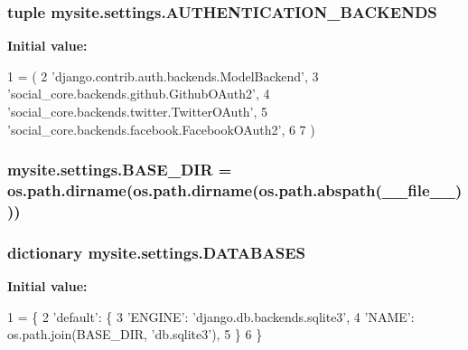 \subsubsection[{\texorpdfstring{A\+U\+T\+H\+E\+N\+T\+I\+C\+A\+T\+I\+O\+N\+\_\+\+B\+A\+C\+K\+E\+N\+DS}{AUTHENTICATION_BACKENDS}}]{\setlength{\rightskip}{0pt plus 5cm}tuple mysite.\+settings.\+A\+U\+T\+H\+E\+N\+T\+I\+C\+A\+T\+I\+O\+N\+\_\+\+B\+A\+C\+K\+E\+N\+DS}\hypertarget{namespacemysite_1_1settings_a6224dd38a093d2571bb1f7cb15f252b8}{}\label{namespacemysite_1_1settings_a6224dd38a093d2571bb1f7cb15f252b8}
{\bfseries Initial value\+:}
\begin{DoxyCode}
1 = (
2     \textcolor{stringliteral}{'django.contrib.auth.backends.ModelBackend'},
3     \textcolor{stringliteral}{'social\_core.backends.github.GithubOAuth2'},
4     \textcolor{stringliteral}{'social\_core.backends.twitter.TwitterOAuth'},
5     \textcolor{stringliteral}{'social\_core.backends.facebook.FacebookOAuth2'},
6 
7 )
\end{DoxyCode}
\subsubsection[{\texorpdfstring{B\+A\+S\+E\+\_\+\+D\+IR}{BASE_DIR}}]{\setlength{\rightskip}{0pt plus 5cm}mysite.\+settings.\+B\+A\+S\+E\+\_\+\+D\+IR = os.\+path.\+dirname(os.\+path.\+dirname(os.\+path.\+abspath(\+\_\+\+\_\+file\+\_\+\+\_\+)))}\hypertarget{namespacemysite_1_1settings_a88bb6a8924ccca687362017da9110d54}{}\label{namespacemysite_1_1settings_a88bb6a8924ccca687362017da9110d54}
\subsubsection[{\texorpdfstring{D\+A\+T\+A\+B\+A\+S\+ES}{DATABASES}}]{\setlength{\rightskip}{0pt plus 5cm}dictionary mysite.\+settings.\+D\+A\+T\+A\+B\+A\+S\+ES}\hypertarget{namespacemysite_1_1settings_a04300628acd12c08ea63ee5f9d3d83d1}{}\label{namespacemysite_1_1settings_a04300628acd12c08ea63ee5f9d3d83d1}
{\bfseries Initial value\+:}
\begin{DoxyCode}
1 = \{
2     \textcolor{stringliteral}{'default'}: \{
3         \textcolor{stringliteral}{'ENGINE'}: \textcolor{stringliteral}{'django.db.backends.sqlite3'},
4         \textcolor{stringliteral}{'NAME'}: os.path.join(BASE\_DIR, \textcolor{stringliteral}{'db.sqlite3'}),
5     \}
6 \}
\end{DoxyCode}

